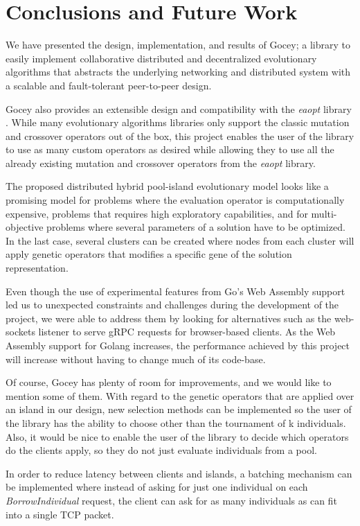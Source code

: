 \chapter{Conclusions and Future Work}

We have presented the design, implementation, and results of Gocey; a library to easily implement collaborative distributed and decentralized evolutionary algorithms that abstracts the underlying networking and distributed system with a scalable and fault-tolerant peer-to-peer design.

Gocey also provides an extensible design and compatibility with the \textit{eaopt} library \cite{eaopt}. While many evolutionary algorithms libraries only support the classic mutation and crossover operators out of the box, this project enables the user of the library to use as many custom operators as desired while allowing they to use all the already existing mutation and crossover operators from the \textit{eaopt} library.

The proposed distributed hybrid pool-island evolutionary model looks like a promising model for problems where the evaluation operator is computationally expensive, problems that requires high exploratory capabilities, and for multi-objective problems where several parameters of a solution have to be optimized. In the last case, several clusters can be created where nodes from each cluster will apply genetic operators that modifies a specific gene of the solution representation.

Even though the use of experimental features from Go's Web Assembly support led us to unexpected constraints and challenges during the development of the project, we were able to address them by looking for alternatives such as the web-sockets listener to serve gRPC requests for browser-based clients. As the Web Assembly support for Golang increases, the performance achieved by this project will increase without having to change much of its code-base.

Of course, Gocey has plenty of room for improvements, and we would like to mention some of them. With regard to the genetic operators that are applied over an island in our design, new selection methods can be implemented so the user of the library has the ability to choose other than the tournament of k individuals. Also, it would be nice to enable the user of the library to decide which operators do the clients apply, so they do not just evaluate individuals from a pool. 

In order to reduce latency between clients and islands, a batching mechanism can be implemented where instead of asking for just one individual on each \textit{BorrowIndividual} request, the client can ask for as many individuals as can fit into a single TCP packet.

